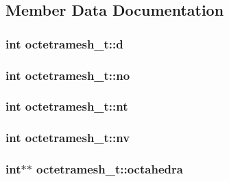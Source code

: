 \subsection{Member Data Documentation}
\hypertarget{structoctetramesh__t_ade06d552058fff629cb2d30526596ffe}{
\subsubsection[{d}]{\setlength{\rightskip}{0pt plus 5cm}int {\bf octetramesh\_\-t::d}}}
\label{structoctetramesh__t_ade06d552058fff629cb2d30526596ffe}
\hypertarget{structoctetramesh__t_a1f5c59c2b77adf6a65e3674e19753aef}{
\subsubsection[{no}]{\setlength{\rightskip}{0pt plus 5cm}int {\bf octetramesh\_\-t::no}}}
\label{structoctetramesh__t_a1f5c59c2b77adf6a65e3674e19753aef}
\hypertarget{structoctetramesh__t_af6d553cee2b98ceae1277c7f5580094f}{
\subsubsection[{nt}]{\setlength{\rightskip}{0pt plus 5cm}int {\bf octetramesh\_\-t::nt}}}
\label{structoctetramesh__t_af6d553cee2b98ceae1277c7f5580094f}
\hypertarget{structoctetramesh__t_aa25cbd4f9e849a1c2535d94c8ea901b0}{
\subsubsection[{nv}]{\setlength{\rightskip}{0pt plus 5cm}int {\bf octetramesh\_\-t::nv}}}
\label{structoctetramesh__t_aa25cbd4f9e849a1c2535d94c8ea901b0}
\hypertarget{structoctetramesh__t_a91308dcaf1e928418dbf84ae3b673044}{
\subsubsection[{octahedra}]{\setlength{\rightskip}{0pt plus 5cm}int$\ast$$\ast$ {\bf octetramesh\_\-t::octahedra}}}
